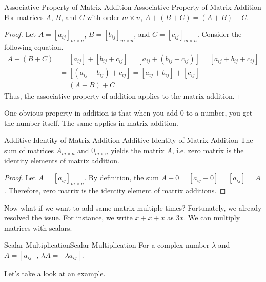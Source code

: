\documentclass[../main.tex]{subfiles}
\begin{document}
\begin{theorem}{Associative Property of Matrix Addition}
{Associative Property of Matrix Addition}
For matrices $A$, $B$, and $C$ with order $m \times n$,
$A + (B + C) = (A + B) + C$.
\end{theorem}
\begin{proof}
Let $A = [a_{ij}]_{m \times n}$, $B = [b_{ij}]_{m \times n}$,
and $C = [c_{ij}]_{m \times n}$. Consider the following equation.
\begin{align*}
    A + (B + C)
    &= [a_{ij}] + [b_{ij} + c_{ij}]
     = [a_{ij} + (b_{ij} + c_{ij})]
     = [a_{ij} + b_{ij} + c_{ij}] \\
    &= [(a_{ij} + b_{ij}) + c_{ij}]
     = [a_{ij} + b_{ij}] + [c_{ij}] \\
    &= (A + B) + C
\end{align*}
Thus, the associative property of addition applies to the matrix
addition.
\end{proof}

One obvious property in addition is that when you add $0$ to a number,
you get the number itself. The same applies in matrix addition.

\begin{theorem}{Additive Identity of Matrix Addition}
{Additive Identity of Matrix Addition}
The sum of matrices $A_{m \times n}$ and $0_{m \times n}$ yields
the matrix $A$, i.e. zero matrix is the identity elements of
matrix addition.
\end{theorem}
\begin{proof}
Let $A = [a_{ij}]_{m \times n}$. By definition, the sum $A + 0
= [a_{ij} + 0] = [a_{ij}] = A$. Therefore, zero matrix is the
identity element of matrix additions.
\end{proof}

Now what if we want to add same matrix multiple times? Fortunately,
we already resolved the issue. For instance, we write $x + x + x$
as $3x$. We can multiply matrices with scalars.

\begin{theorem}{Scalar Multiplication}{Scalar Multiplication}
For a complex number $\lambda$ and $A = [a_{ij}]$, $\lambda A
= [\lambda a_{ij}]$.
\end{theorem}

Let's take a look at an example.
\end{document}
